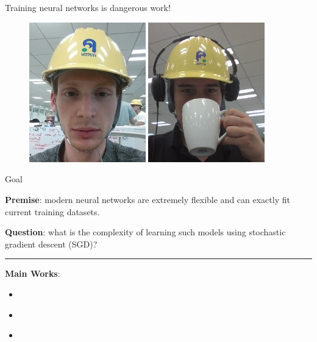 \documentclass[mathserif,notheorems, hyperref={colorlinks, citecolor=blue, urlcolor=blue, linkcolor=blue}]{beamer}
\begin{document}
    \begin{frame}{Training neural networks is dangerous work!}
       
       \begin{figure}
            \centering
            \includegraphics[width=0.45\textwidth]{collaborators/helmet1} 
            \includegraphics[width=0.45\textwidth]{collaborators/helmet2} 
       \end{figure} 
    \end{frame}
   
    \begin{frame}{Goal}
        \Large 
        
        \textbf{Premise}: modern neural networks are extremely flexible and can exactly fit current training datasets. 
       
        \vspace{1ex} 

        \textbf{Question}: what is the complexity of learning such models using stochastic gradient descent (SGD)?%
        
        \vspace{1ex} 
        \pause%
        \rule{\textwidth}{0.4pt}%
        \vspace{1ex} 

        \textbf{Main Works}:
        \begin{itemize}
            \item \citet*{schmidt2013fast}
            \item \citet*{vaswani2019fast}
            \item \citet*{vaswani2019painless}
        \end{itemize}

    \end{frame}
\end{document}
